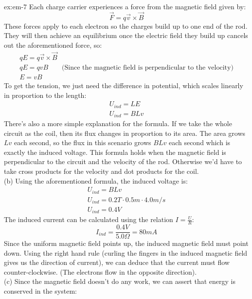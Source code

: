 \begin{solution}{ex:em-7}
  Each charge carrier experiences a force from the magnetic field given by:
  \[
     \overrightarrow{F}=q \overrightarrow{v}\times\overrightarrow{B}
  \]
  These forces apply to each electron so the charges build up to one end of the rod. They will then achieve an equilibrium once the electric field they build up cancels out the aforementioned force, so:
  \[
    \begin{gathered}
      qE=q \overrightarrow{v} \times \overrightarrow{B}\\
      qE=qvB \qquad \text{(Since the magnetic field is perpendicular to the velocity)}\\
      E=vB
    \end{gathered}
  \]
  To get the tension, we just need the difference in potential, which scales linearly in proportion to the length:
  \[
    \begin{gathered}
      U_{ind}=LE\\
      U_{ind}=BLv
    \end{gathered}
  \]
  There's also a more simple explanation for the formula. If we take the whole circuit as the coil, then its flux changes in proportion to its area. The area grows $Lv$ each second, so the flux in this scenario grows $BLv$ each second which is exactly the induced voltage. This formula holds when the magnetic field is perpendicular to the circuit and the velocity of the rod. Otherwise we'd have to take cross products for the velocity and dot products for the coil.\\
  (b) Using the aforementioned formula, the induced voltage is:
  \[
    \begin{gathered}
      U_{ind}=BLv\\
      U_{ind}=0.2 T \cdot 0.5 m \cdot 4.0 m/s\\
      U_{ind}=0.4 V
    \end{gathered}
  \]
  The induced current can be calculated using the relation $I=\frac{U}{R}$:
  \[
    I_{ind}=\frac{0.4 V}{5.0 \Omega}=80 mA
  \]
  Since the uniform magnetic field points up, the induced magnetic field must point down. Using the right hand rule (curling the fingers in the induced magnetic field gives us the direction of current), we can deduce that the current must flow counter-clockwise. (The electrons flow in the opposite direction).\\
  (c) Since the magnetic field doesn't do any work, we can assert that energy is conserved in the system:
  \[
    \begin{gathered}

\end{gathered}\]
\end{solution}
